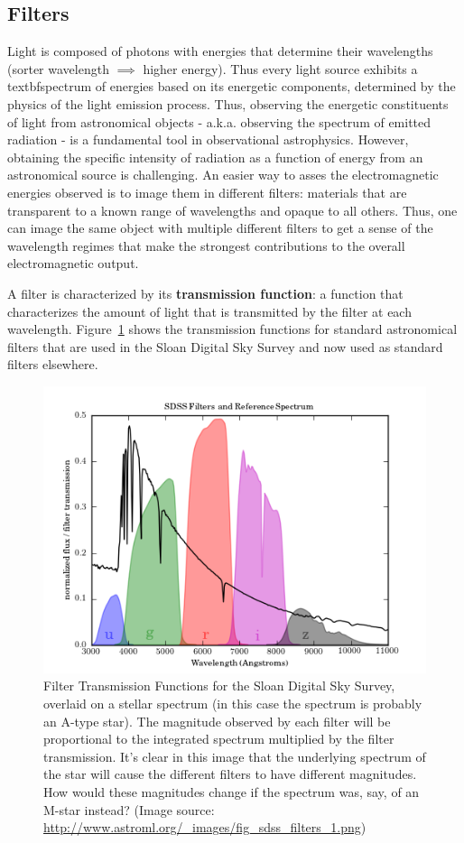 \subsection{Filters}
Light is composed of photons with energies that determine their wavelengths (sorter wavelength $\implies$ higher energy). Thus every light source exhibits a textbf{spectrum} of energies based on its energetic components, determined by the physics of the light emission process. Thus, observing the energetic constituents of light from astronomical objects - a.k.a. observing the spectrum of emitted radiation - is a fundamental tool in observational astrophysics. However, obtaining the specific intensity of radiation as a function of energy from an astronomical source is challenging. An easier way to asses the electromagnetic energies observed is to image them in different filters: materials that are transparent to a known range of wavelengths and opaque to all others. Thus, one can image the same object with multiple different filters to get a sense of the wavelength regimes that make the strongest contributions to the overall electromagnetic output. 

A filter is characterized by its \textbf{transmission function}: a function that characterizes the amount of light that is transmitted by the filter at each wavelength. Figure~\ref{sot:fig:filters} shows the transmission functions for standard astronomical filters that are used in the Sloan Digital Sky Survey and now used as standard filters elsewhere.%

\begin{figure}
	\centering
	\includegraphics{small-optical-telescopes/fig_sdss_filters_1.png}
	\caption{Filter Transmission Functions for the Sloan Digital Sky Survey, overlaid on a stellar spectrum (in this case the spectrum is probably an
		A-type star). The magnitude observed by each filter will be proportional to the integrated spectrum multiplied by the filter transmission. It's clear in this image that the underlying spectrum of the star will cause the different filters to have different magnitudes. How would these magnitudes change if the spectrum was, say, of an M-star instead? (Image source: \url{http://www.astroml.org/\_images/fig\_sdss\_filters\_1.png})}\label{sot:fig:filters}
\end{figure}

